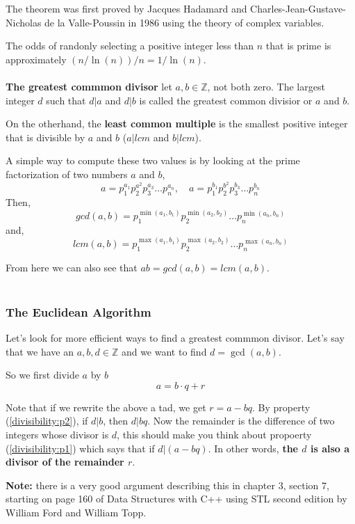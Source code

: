 The theorem was first proved by Jacques Hadamard and Charles-Jean-Gustave-Nicholas de la Valle-Poussin
in 1986 using the theory of complex variables.

The odds of randonly selecting a positive integer less than $n$ that is prime is approximately $(n / \ln(n)) / n = 1 / \ln(n)$.
\\~\\


\textbf{The greatest commmon divisor} let $a,b \in \mathbb{Z}$, not both zero.
The largest integer $d$ such that $d|a$ and $d|b$ is called the greatest common divisior or $a$ and $b$.

On the otherhand, the \textbf{least common multiple} is the smallest positive integer that is divisible by $a$ and $b$
($a|lcm$ and $b|lcm$).

A simple way to compute these two values is by looking at the prime factorization of two numbers $a$ and $b$,
$$
a = p^{a_1}_{1} p^{a^2}_{2} p^{a_3}_{3} \ldots p^{a_n}_{n}, \quad a = p^{b_1}_{1} p^{b^2}_{2} p^{b_3}_{3} \ldots p^{b_n}_{n}
$$
Then,
$$
gcd(a,b) = p^{\min(a_1, b_1)}_{1} p^{\min(a_2, b_2)}_{2} \ldots p^{\min(a_n, b_n)}_{n}
$$
and,
$$
lcm(a,b) = p^{\max(a_1, b_1)}_{1} p^{\max(a_2, b_2)}_{2} \ldots p^{\max(a_n, b_n)}_{n}
$$

From here we can also see that $ab = gcd(a,b) = lcm(a,b)$.
\\~\\


\subsubsection{The Euclidean Algorithm}

Let's look for more efficient ways to find a greatest commmon divisor.
Let's say that we have an $a,b,d \in \mathbb{Z}$ and we want to find $d = \gcd(a,b)$.

So we first divide $a$ by $b$
$$
a = b\cdot q + r
$$

Note that if we rewrite the above a tad, we get $r = a - bq$.
By property (\ref{divisibility:p2}), if $d|b$, then $d|bq$.
Now the remainder is the difference of two integers whose divisor is $d$, this should make you think about
propoerty (\ref{divisibility:p1}) which says that if $d | (a - bq)$.
In other words, \textbf{the $d$ is also a divisor of the remainder $r$}.

\textbf{Note:} there is a very good argument describing this in chapter 3, section 7, starting on page 160 of
Data Structures with C++ using STL second edition by William Ford and William Topp.

